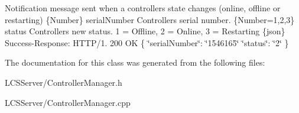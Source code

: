 Notification message sent when a controller\textquotesingle{}s state changes (online, offline or restarting)  \{Number\} serial\+Number Controller\textquotesingle{}s serial number.  \{Number=1,2,3\} status Controller\textquotesingle{}s new status. 1 = Offline, 2 = Online, 3 = Restarting  \{json\} Success-\/\+Response\+: H\+T\+T\+P/1. 200 OK \{ \char`\"{}serial\+Number\char`\"{}\+: \char`\"{}1546165\char`\"{} \char`\"{}status\char`\"{}\+: \char`\"{}2\char`\"{} \} 

The documentation for this class was generated from the following files\+:\begin{DoxyCompactItemize}
\item 
L\+C\+S\+Server/Controller\+Manager.\+h\item 
L\+C\+S\+Server/Controller\+Manager.\+cpp\end{DoxyCompactItemize}
